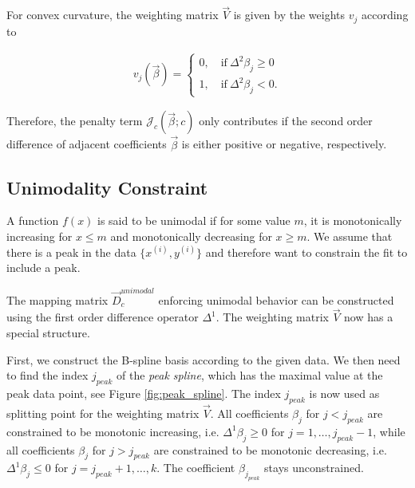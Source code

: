 \documentclass[10pt,a4paper]{article}
\begin{document}
	For convex curvature, the weighting matrix $\vec{V}$ is given by the weights $v_j$ according to

	\begin{align}\label{eq:v_curvature_convex}
		v_j(\vec{\beta}) = \begin{cases} 
										0, \quad \text{if} \ \Delta^2\beta_j \ge 0 \\ 
										1, \quad \text{if} \ \Delta^2\beta_j < 0. 
								  \end{cases}
	\end{align}	
	
	Therefore, the penalty term $\mathcal{J}_c(\vec{\beta}; c)$ only contributes if the second order difference of adjacent coefficients $\vec{\beta}$ is either positive or negative, respectively. \cite{eilers2005unimodal}
	
	\subsection{Unimodality Constraint}
	
	A function $f(x)$ is said to be unimodal if for some value $m$, it is monotonically increasing for $x \le m$ and monotonically decreasing for $x \ge m$. We assume that there is a peak in the data $\{x^{(i)}, y^{(i)}\}$ and therefore want to constrain the fit to include a peak.
	
	The mapping matrix $\vec{D}_c^{unimodal}$ enforcing unimodal behavior can be constructed using the first order difference operator $\Delta^1$. The weighting matrix $\vec{V}$ now has a special structure. 
	
	First, we construct the B-spline basis according to the given data. We then need to find the index $j_{peak}$ of the \emph{peak spline}, which has the maximal value at the peak data point, see Figure \ref{fig:peak_spline}. The index $j_{peak}$ is now used as splitting point for the weighting matrix $\vec{V}$. All coefficients $\beta_j$ for $j < j_{peak}$ are constrained to be monotonic increasing, i.e. $\Delta^1 \beta_j \ge 0$ for $j = 1, \dots, j_{peak}-1$, while all coefficients $\beta_j$ for $j > j_{peak}$ are constrained to be monotonic decreasing, i.e. $\Delta^1 \beta_j \le 0$ for $j = j_{peak}+1, \dots, k$. The coefficient $\beta_{j_{peak}}$ stays unconstrained. \cite{eilers2005unimodal} 
	
\end{document}
